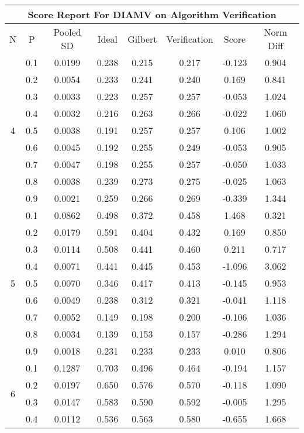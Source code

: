 \documentclass[11pt,a4paper]{report}
\begin{document}
\begin{longtable}{ | c | c || c | c | c | c | c | c | }
\hline
\multicolumn{8}{|c|}{ Score Report For DIAMV on Algorithm Verification} \\
\hline
N & P & Pooled SD &  Ideal &  Gilbert & Verification  & Score & Norm Diff \\
 \hline
 \hline
 \endhead
\multirow{9}{*}{4} & 0.1 & 0.0199 & 0.238 & 0.215 & 0.217 & -0.123 & 0.904 \\
 & 0.2 & 0.0054 & 0.233 & 0.241 & 0.240 & 0.169 & 0.841 \\
 & 0.3 & 0.0033 & 0.223 & 0.257 & 0.257 & -0.053 & 1.024 \\
 & 0.4 & 0.0032 & 0.216 & 0.263 & 0.266 & -0.022 & 1.060 \\
 & 0.5 & 0.0038 & 0.191 & 0.257 & 0.257 & 0.106 & 1.002 \\
 & 0.6 & 0.0045 & 0.192 & 0.255 & 0.249 & -0.053 & 0.905 \\
 & 0.7 & 0.0047 & 0.198 & 0.255 & 0.257 & -0.050 & 1.033 \\
 & 0.8 & 0.0038 & 0.239 & 0.273 & 0.275 & -0.025 & 1.063 \\
 & 0.9 & 0.0021 & 0.259 & 0.266 & 0.269 & -0.339 & 1.344 \\
 \hline
\multirow{9}{*}{5} & 0.1 & 0.0862 & 0.498 & 0.372 & 0.458 & 1.468 & 0.321 \\
 & 0.2 & 0.0179 & 0.591 & 0.404 & 0.432 & 0.169 & 0.850 \\
 & 0.3 & 0.0114 & 0.508 & 0.441 & 0.460 & 0.211 & 0.717 \\
 & 0.4 & 0.0071 & 0.441 & 0.445 & 0.453 & -1.096 & 3.062 \\
 & 0.5 & 0.0070 & 0.346 & 0.417 & 0.413 & -0.145 & 0.953 \\
 & 0.6 & 0.0049 & 0.238 & 0.312 & 0.321 & -0.041 & 1.118 \\
 & 0.7 & 0.0052 & 0.149 & 0.198 & 0.200 & -0.106 & 1.036 \\
 & 0.8 & 0.0034 & 0.139 & 0.153 & 0.157 & -0.286 & 1.294 \\
 & 0.9 & 0.0018 & 0.231 & 0.233 & 0.233 & 0.010 & 0.806 \\
 \hline
\multirow{9}{*}{6} & 0.1 & 0.1287 & 0.703 & 0.496 & 0.464 & -0.194 & 1.157 \\
 & 0.2 & 0.0197 & 0.650 & 0.576 & 0.570 & -0.118 & 1.090 \\
 & 0.3 & 0.0147 & 0.583 & 0.590 & 0.592 & -0.005 & 1.295 \\
 & 0.4 & 0.0112 & 0.536 & 0.563 & 0.580 & -0.655 & 1.668 \\

\end{longtable}
\end{document}
